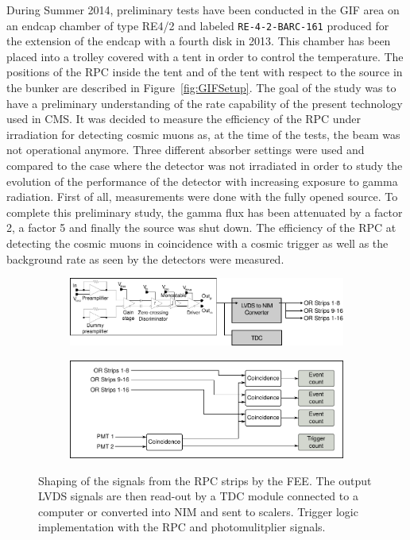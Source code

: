 	During Summer 2014, preliminary tests have been conducted in the GIF area on an endcap chamber of type RE4/2 and labeled \texttt{RE-4-2-BARC-161} produced for the extension of the endcap with a fourth disk in 2013. This chamber has been placed into a trolley covered with a tent in order to control the temperature. The positions of the RPC inside the tent and of the tent with respect to the source in the bunker are described in Figure~\ref{fig:GIFSetup}. The goal of the study was to have a preliminary understanding of the rate capability of the present technology used in CMS. It was decided to measure the efficiency of the RPC under irradiation for detecting cosmic muons as, at the time of the tests, the beam was not operational anymore. Three different absorber settings were used and compared to the case where the detector was not irradiated in order to study the evolution of the performance of the detector with increasing exposure to gamma radiation. First of all, measurements were done with the fully opened source. To complete this preliminary study, the gamma flux has been attenuated by a factor 2, a factor 5 and finally the source was shut down. The efficiency of the RPC at detecting the cosmic muons in coincidence with a cosmic trigger as well as the background rate as seen by the detectors were measured.

	\begin{figure}[H]
		\begin{subfigure}{\linewidth}
			\centering
			\includegraphics[width = \plotwidth]{fig/chapt5/pulse-processing.pdf}\\
			\caption{\label{fig:DAQ:A}}
		\end{subfigure}
		\begin{subfigure}{\linewidth}
			\centering
			\includegraphics[width = \plotwidth]{fig/chapt5/pulse-processing-2.pdf}
			\caption{\label{fig:DAQ:B}}
		\end{subfigure}
		\caption{\label{fig:DAQ}  Shaping of the signals from the RPC strips by the FEE. The output LVDS signals are then read-out by a TDC module connected to a computer or converted into NIM and sent to scalers.  Trigger logic implementation with the RPC and photomulitplier signals.}
	\end{figure}
	
